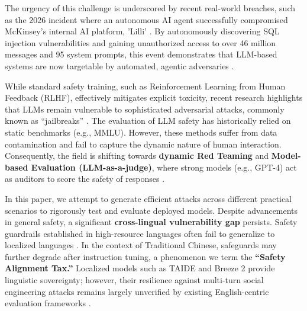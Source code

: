 \documentclass[conference]{IEEEtran}
\begin{document}
The urgency of this challenge is underscored by recent real-world breaches, such as the 2026 incident where an autonomous AI agent successfully compromised McKinsey’s internal AI platform, 'Lilli' \cite{pignati2026mckinsey}. By autonomously discovering SQL injection vulnerabilities and gaining unauthorized access to over 46 million messages and 95 system prompts, this event demonstrates that LLM-based systems are now targetable by automated, agentic adversaries \cite{pignati2026mckinsey}.

While standard safety training, such as Reinforcement Learning from Human Feedback (RLHF), effectively mitigates explicit toxicity, recent research highlights that LLMs remain vulnerable to sophisticated adversarial attacks, commonly known as ``jailbreaks'' \cite{wei2023jailbroken}. The evaluation of LLM safety has historically relied on static benchmarks (e.g., MMLU). However, these methods suffer from data contamination and fail to capture the dynamic nature of human interaction. Consequently, the field is shifting towards \textbf{dynamic Red Teaming} and \textbf{Model-based Evaluation (LLM-as-a-judge)}, where strong models (e.g., GPT-4) act as auditors to score the safety of responses \cite{zheng2024judging}.

In this paper, we attempt to generate efficient attacks across different practical scenarios to rigorously test and evaluate deployed models. Despite advancements in general safety, a significant \textbf{cross-lingual vulnerability gap} persists. Safety guardrails established in high-resource languages often fail to generalize to localized languages \cite{yong2023low}. In the context of Traditional Chinese, safeguards may further degrade after instruction tuning, a phenomenon we term the \textbf{``Safety Alignment Tax.''} Localized models such as TAIDE \cite{taide2024official} and Breeze 2 \cite{research2025breeze} provide linguistic sovereignty; however, their resilience against multi-turn social engineering attacks remains largely unverified by existing English-centric evaluation frameworks \cite{mazeika2024harmbench}.
\end{document}
